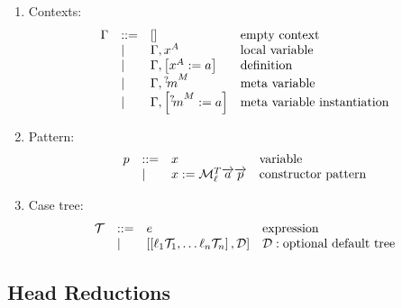 \begin{enumerate}
    \item Contexts:
        $$
        \begin{array}{lllll} 
            \Gamma
            &::=&
            []
            &\text{empty context}
            \\
            &\mid&
            \Gamma, x^A
            &\text{local variable}
            \\
            &\mid&
            \Gamma, \left[ {x^A := a} \right]
            &\text{definition}
            \\
            &\mid&
            \Gamma, {{}^? \kern-0.2em m}^M
            &\text{meta variable}
            \\
            &\mid&
            \Gamma, \left[ {{{}^? \kern-0.2em m}^M := a} \right]
            &\text{meta variable instantiation}
         \end{array}
        $$

    \item Pattern:
        $$
        \begin{array}{lllll} 
            p &::=& x & \text{variable}
            \\
            &\mid& x := {\cal M}^T_\ell {\overrightarrow {a}} {\overrightarrow {p}}
            & \text{constructor pattern}
         \end{array}
        $$


    \item Case tree:
        $$
        \begin{array}{lllll} 
            {\mathcal T}
            &::=&
            e & \text{expression}
            \\
            &\mid&
            \left[ {\left[ {\ell_1 {{\mathcal T}}_1, \ldots \ell_n {{\mathcal T}}_n} \right], {\mathcal D}} \right]
            & {\mathcal D}: \text{optional default tree}
         \end{array}
        $$
\end{enumerate}





\subsection{Head Reductions}

